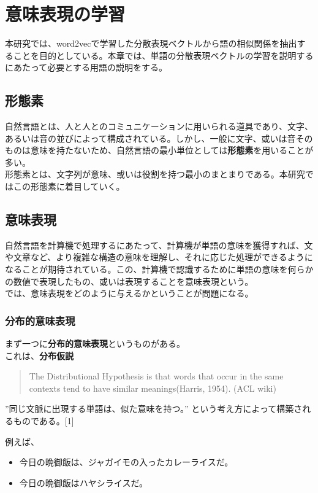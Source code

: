 \chapter{意味表現の学習}
本研究では、word2vecで学習した分散表現ベクトルから語の相似関係を抽出することを目的としている。本章では、単語の分散表現ベクトルの学習を説明するにあたって必要とする用語の説明をする。

\section{形態素}
自然言語とは、人と人とのコミュニケーションに用いられる道具であり、文字、あるいは音の並びによって構成されている。しかし、一般に文字、或いは音そのものは意味を持たないため、自然言語の最小単位としては\textbf{形態素}を用いることが多い。\\
形態素とは、文字列が意味、或いは役割を持つ最小のまとまりである。本研究ではこの形態素に着目していく。

\section{意味表現}
自然言語を計算機で処理するにあたって、計算機が単語の意味を獲得すれば、文や文章など、より複雑な構造の意味を理解し、それに応じた処理ができるようになることが期待されている。この、計算機で認識するために単語の意味を何らかの数値で表現したもの、或いは表現することを意味表現という。\\
では、意味表現をどのように与えるかということが問題になる。

\subsection{分布的意味表現}
まず一つに\textbf{分布的意味表現}というものがある。\\
これは、\textbf{分布仮説}
\begin{quote}
  The Distributional Hypothesis is that words that occur in the same contexts tend to have similar meanings(Harris, 1954). (ACL wiki)
\end{quote}
”同じ文脈に出現する単語は、似た意味を持つ。”
という考え方によって構築されるものである。[1]

例えば、

\begin{itemize}
  \item 今日の晩御飯は、ジャガイモの入ったカレーライスだ。
  \item 今日の晩御飯はハヤシライスだ。
\end{itemize}


